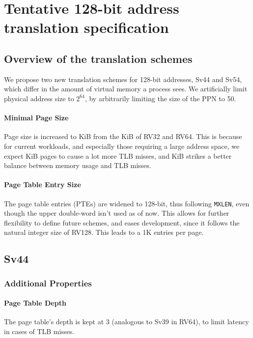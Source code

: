 \documentclass[a4paper]{article}
\begin{document}
 
\section{Tentative 128-bit address translation specification} 
\label{vm_spec}
\subsection{Overview of the translation schemes}
\noindent%
We propose two new translation schemes for 128-bit addresses, Sv44 and Sv54, which differ in the amount of virtual memory a process sees.
We artificially limit physical address size to $2^{64}$, by arbitrarily limiting the size of the PPN to 50.


\paragraph{Minimal Page Size}
Page size is increased to \unit[16]{KiB} from the \unit[4]{KiB} of RV32 and RV64.
This is because for current workloads, and especially those requiring a large address space, we expect \unit[4]{KiB} pages to cause a lot more TLB misses, and \unit[16]{KiB} strikes a better balance between memory usage and TLB misses.

\paragraph{Page Table Entry Size}
The page table entries (PTEs) are widened to 128-bit, thus following \texttt{MXLEN}, even though the upper double-word isn't used as of now.
This allows for further flexibility to define future schemes, and eases development, since it follows the natural integer size of RV128.
This leads to a 1K entries per page.

\subsection{Sv44}
\subsubsection{Additional Properties}
\paragraph{Page Table Depth}
\noindent%
The page table's depth is kept at 3 (analogous to Sv39 in RV64), to limit latency in cases of TLB misses.
\end{document}

